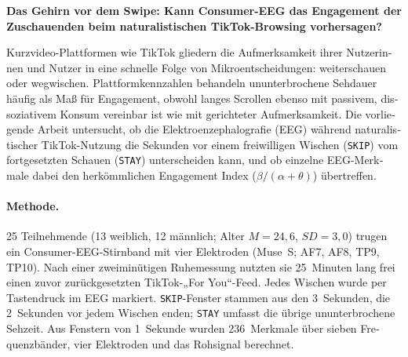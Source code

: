 \documentclass[12pt,a4paper]{report}
\begin{document}
\begin{otherlanguage}{ngerman}
\textbf{Das Gehirn vor dem Swipe: Kann Consumer-EEG das Engagement der Zuschauenden beim naturalistischen TikTok-Browsing vorhersagen?}

\medskip
Kurzvideo-Plattformen wie TikTok gliedern die Aufmerksamkeit ihrer Nutzerinnen und Nutzer in eine schnelle Folge von Mikroentscheidungen: weiterschauen oder wegwischen. Plattformkennzahlen behandeln ununterbrochene Sehdauer häufig als Maß für Engagement, obwohl langes Scrollen ebenso mit passivem, dissoziativem Konsum vereinbar ist wie mit gerichteter Aufmerksamkeit. Die vorliegende Arbeit untersucht, ob die Elektroenzephalografie (EEG) während naturalistischer TikTok-Nutzung die Sekunden vor einem freiwilligen Wischen (\texttt{SKIP}) vom fortgesetzten Schauen (\texttt{STAY}) unterscheiden kann, und ob einzelne EEG-Merkmale dabei den herkömmlichen Engagement Index (\(\beta/(\alpha+\theta)\)) übertreffen.

\paragraph{Methode.} 25 Teilnehmende (13 weiblich, 12 männlich; Alter \(M=24{,}6\), \(SD=3{,}0\)) trugen ein Consumer-EEG-Stirnband mit vier Elektroden (Muse~S; AF7, AF8, TP9, TP10). Nach einer zweiminütigen Ruhemessung nutzten sie 25~Minuten lang frei einen zuvor zurückgesetzten TikTok-„For You“-Feed. Jedes Wischen wurde per Tastendruck im EEG markiert. \texttt{SKIP}-Fenster stammen aus den 3~Sekunden, die 2~Sekunden vor jedem Wischen enden; \texttt{STAY} umfasst die übrige ununterbrochene Sehzeit. Aus Fenstern von 1~Sekunde wurden 236~Merkmale über sieben Frequenzbänder, vier Elektroden und das Rohsignal berechnet.


\end{otherlanguage}
\end{document}
